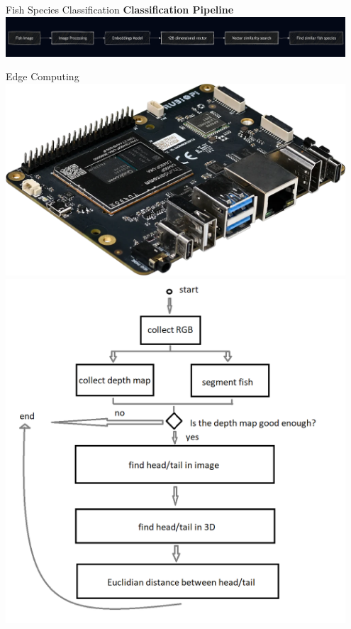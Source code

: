 \begin{frame}{Fish Species Classification}
    \centering
    \textbf{\LARGE Classification Pipeline} \\[1em]
    \includegraphics[height=0.8\textheight, width=0.95\textwidth, keepaspectratio]{images/classification_pipe.png}
\end{frame}

\begin{frame}{Edge Computing}
    \centering
    \includegraphics[height=0.8\textheight,width=0.95\textwidth,keepaspectratio]{images/rubik-pi-3-1.webp}
    \includegraphics[height=0.8\textheight,width=0.95\textwidth,keepaspectratio]{images/dwe-diagram.png}

\end{frame}
